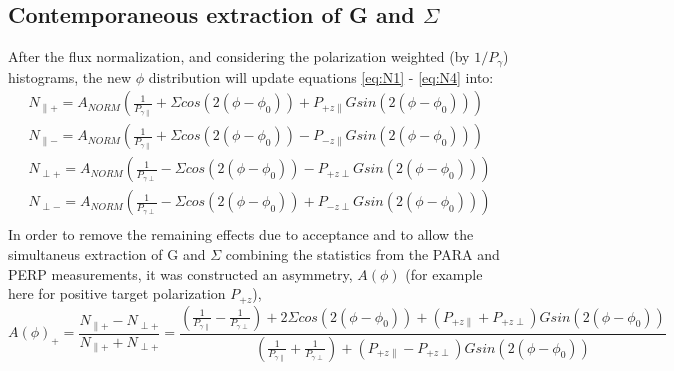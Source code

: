 \subsection{Contemporaneous extraction of G and \texorpdfstring{$\Sigma$}{Sigma}} \label{ch:extract_G_S}
After the flux normalization, and considering the polarization weighted (by $1/P_{\gamma}$) histograms, the new $\phi$ distribution will update equations \ref{eq:N1} - \ref{eq:N4} into:
\begin{eqnarray}
N_{\parallel +} = A_{NORM} \left( \frac{1}{P_{\gamma \parallel}} + \Sigma cos(2(\phi-\phi_0)) +  P_{+z\parallel} G sin(2(\phi-\phi_0)) \right) \label{eq:UN1}\\
N_{\parallel -} = A_{NORM} \left(\frac{1}{P_{\gamma \parallel}} + \Sigma cos(2(\phi-\phi_0)) - P_{-z\parallel} G sin(2(\phi-\phi_0)) \right) \label{eq:UN2}\\
N_{\perp +} = A_{NORM} \left( \frac{1}{P_{\gamma \perp}} - \Sigma cos(2(\phi-\phi_0)) -  P_{+z\perp} G sin(2(\phi-\phi_0)) \right) \label{eq:UN3}\\
N_{\perp -} = A_{NORM} \left( \frac{1}{P_{\gamma \perp}} - \Sigma cos(2(\phi-\phi_0)) +  P_{-z\perp} G sin(2(\phi-\phi_0)) \right) \label{eq:UN4}\\
\end{eqnarray}
In order to remove the remaining effects due to acceptance and to allow the simultaneus extraction of G and $\Sigma$ combining the statistics from the PARA and PERP measurements, it was constructed an asymmetry, $A(\phi)$ (for example here for positive target polarization $P_{+z}$),
\begin{equation}
  A(\phi)_+ = \frac{N_{\parallel +} - N_{\perp +}}{N_{\parallel +} + N_{\perp +}} = \frac{ (\frac{1}{P_{\gamma \parallel}} - \frac{1}{P_{\gamma \perp}}) + 2 \Sigma cos(2(\phi-\phi_0)) +  (P_{+z\parallel}+P_{+z\perp}) G sin(2(\phi-\phi_0))}{(\frac{1}{P_{\gamma \parallel}} + \frac{1}{P_{\gamma \perp}}) +(P_{+z\parallel}-P_{+z\perp}) G sin(2(\phi-\phi_0))} \label{eq:A1}
\end{equation}
